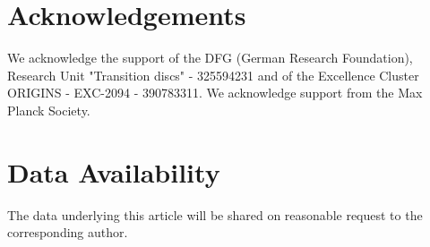 \documentclass[letters,fleqn,usenatbib]{mnras}
\begin{document}
\section*{Acknowledgements}

We acknowledge the support of the DFG (German Research Foundation), Research Unit "Transition discs" - 325594231 and of the Excellence Cluster ORIGINS - EXC-2094 - 390783311. We acknowledge support from the Max Planck Society.

\section*{Data Availability}

The data underlying this article will be shared on reasonable request to the corresponding author.




\appendix

\bsp	%
\label{lastpage}
\end{document}
